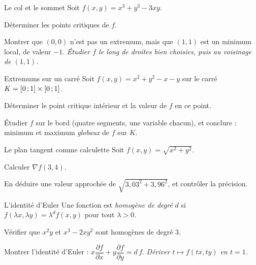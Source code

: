\begin{exercice}[2]{Le col et le sommet}
Soit $f(x,y)=x^{3}+y^{3}-3xy$.
\begin{questions}
  \item Déterminer les points critiques de $f$.
  \item Montrer que $(0,0)$ n'est pas un extremum, mais que $(1,1)$ est
    un minimum local, de valeur $-1$. \emph{Étudier $f$ le long de
    droites bien choisies, puis au voisinage de $(1,1)$.}
\end{questions}
\end{exercice}

\begin{exercice}[2]{Extremums sur un carré}
Soit $f(x,y)=x^{2}+y^{2}-x-y$ sur le carré
$K=\mathopen{[}0\,{;}\,1\mathclose{]}\times\mathopen{[}0\,{;}\,1\mathclose{]}$.
\begin{questions}
  \item Déterminer le point critique intérieur et la valeur de $f$ en ce
    point.
  \item Étudier $f$ sur le bord (quatre segments, une variable chacun),
    et conclure : minimum et maximum \emph{globaux} de $f$ sur $K$.
\end{questions}
\end{exercice}

\begin{exercice}[2]{Le plan tangent comme calculette}
Soit $f(x,y)=\sqrt{x^{2}+y^{2}}$.
\begin{questions}
  \item Calculer $\nabla f(3,4)$.
  \item En déduire une valeur approchée de
    $\sqrt{3{,}03^{2}+3{,}96^{2}}$, et contrôler la précision.
\end{questions}
\end{exercice}

\begin{exercice}[2]{L'identité d'Euler}
Une fonction est \emph{homogène de degré} $d$ si
$f(\lambda x,\lambda y)=\lambda^{d}f(x,y)$ pour tout $\lambda>0$.
\begin{questions}
  \item Vérifier que $x^{2}y$ et $x^{3}-2xy^{2}$ sont homogènes de degré
    $3$.
  \item Montrer l'identité d'Euler :
    $x\dfrac{\partial f}{\partial x}+y\dfrac{\partial f}{\partial y}=d\,f$.
    \emph{Dériver $t\mapsto f(tx,ty)$ en $t=1$.}
\end{questions}
\end{exercice}

